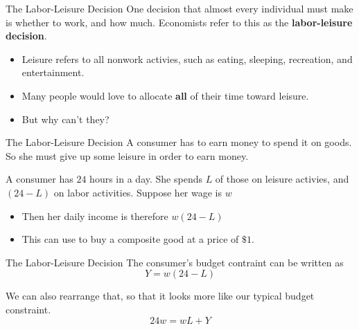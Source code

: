 \documentclass[12pt,t]{beamer}
\begin{document}
\begin{frame}{The Labor-Leisure Decision}
  One decision that almost every individual must make is whether to work, and how much. Economists refer to this as the \textbf{labor-leisure decision}. 

  \bigskip
  \begin{itemize}
    \item Leisure refers to all nonwork activies, such as eating, sleeping, recreation, and entertainment.

    \item Many people would love to allocate \textbf{all} of their time toward leisure.

    \item But why can't they?
  \end{itemize}
\end{frame}

\begin{frame}{The Labor-Leisure Decision}
  A consumer has to earn money to spend it on goods. So she must give up some leisure in order to earn money.

  \bigskip
  A consumer has $24$ hours in a day. She spends $L$ of those on leisure activies, and $(24 - L)$ on labor activities. Suppose her wage is $w$
  
  \bigskip
  \begin{itemize}
    \item Then her daily income is therefore $w(24-L)$ 

    \item This can use to buy a composite good at a price of $\$1$.
  \end{itemize}
\end{frame}

\begin{frame}{The Labor-Leisure Decision}
  The consumer's budget contraint can be written as
  $$
    Y = w (24 - L)
  $$

  \bigskip
  We can also rearrange that, so that it looks more like our typical budget constraint.
  $$
    24w = wL + Y
  $$
\end{frame}
\end{document}
